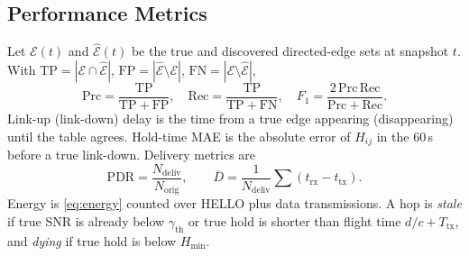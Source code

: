 \documentclass[journal]{IEEEtran}
\begin{document}
\begin{table}[!t]
\caption{Simulation Campaigns}
\label{tab:campaign}
\centering
{}
\end{table}

\subsection{Performance Metrics}
Let $\mathcal{E}(t)$ and $\widehat{\mathcal{E}}(t)$ be the true and
discovered directed-edge sets at snapshot $t$. With
$\mathrm{TP}=|\mathcal{E}\cap\widehat{\mathcal{E}}|$,
$\mathrm{FP}=|\widehat{\mathcal{E}}\setminus\mathcal{E}|$,
$\mathrm{FN}=|\mathcal{E}\setminus\widehat{\mathcal{E}}|$,
\begin{equation}
\mathrm{Prc}=\frac{\mathrm{TP}}{\mathrm{TP}+\mathrm{FP}},\quad
\mathrm{Rec}=\frac{\mathrm{TP}}{\mathrm{TP}+\mathrm{FN}},\quad
F_1=\frac{2\,\mathrm{Prc}\,\mathrm{Rec}}{\mathrm{Prc}+\mathrm{Rec}}.
\label{eq:prf}
\end{equation}
Link-up (link-down) delay is the time from a true edge appearing
(disappearing) until the table agrees. Hold-time MAE is the absolute
error of $H_{ij}$ in the $60$\,s before a true link-down.
Delivery metrics are
\begin{equation}
\mathrm{PDR}=\frac{N_{\mathrm{deliv}}}{N_{\mathrm{orig}}},\qquad
\overline{D}=\frac{1}{N_{\mathrm{deliv}}}\sum (t_{\mathrm{rx}}-t_{\mathrm{tx}}).
\label{eq:pdr}
\end{equation}
Energy is \eqref{eq:energy} counted over HELLO plus data transmissions.
A hop is \emph{stale} if true SNR is already below $\gamma_{\mathrm{th}}$
or true hold is shorter than flight time $d/c+T_{\mathrm{tx}}$, and
\emph{dying} if true hold is below $H_{\min}$.
\end{document}
